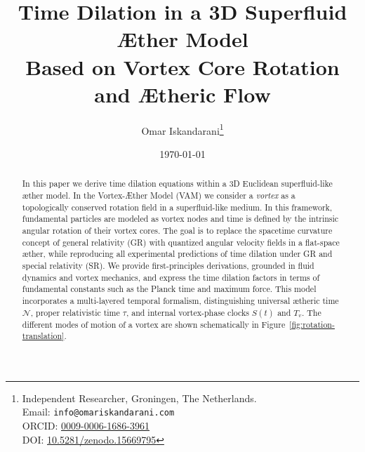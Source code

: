 \documentclass[a4paper,12pt]{article}
\title{Time Dilation in a 3D Superfluid Æther Model\\  Based on Vortex Core Rotation and Ætheric Flow }
\author{
    Omar Iskandarani\thanks{
        Independent Researcher, Groningen, The Netherlands.\\
        Email: \texttt{info@omariskandarani.com}\\
        ORCID: \href{https://orcid.org/0009-0006-1686-3961}{0009-0006-1686-3961}\\
        DOI: \href{https://doi.org/10.5281/zenodo.15669902}{10.5281/zenodo.15669795}
    }
}
\date{\today}
\begin{document}
    \maketitle

    \begin{abstract}

        In this paper we derive time dilation equations within a 3D Euclidean superfluid-like æther model. In the Vortex-Æther Model (VAM) we consider a \textit{vortex} as a topologically conserved rotation field in a superfluid-like medium. In this framework, fundamental particles are modeled as vortex nodes and time is defined by the intrinsic angular rotation of their vortex cores. The goal is to replace the spacetime curvature concept of general relativity (GR) with quantized angular velocity fields in a flat-space æther, while reproducing all experimental predictions of time dilation under GR and special relativity (SR). We provide first-principles derivations, grounded in fluid dynamics and vortex mechanics, and express the time dilation factors in terms of fundamental constants such as the Planck time and maximum force. This model incorporates a multi-layered temporal formalism, distinguishing universal ætheric time $\mathcal{N}$, proper relativistic time $\tau$, and internal vortex-phase clocks $S(t)$ and $T_v$. The different modes of motion of a vortex are shown schematically in Figure~\ref{fig:rotation-translation}.

    \end{abstract}
\end{document}

